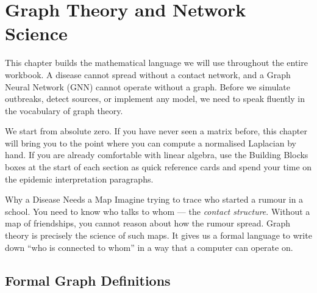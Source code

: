 \chapter{Graph Theory and Network Science}

This chapter builds the mathematical language we will use throughout the entire workbook. A disease cannot spread without a contact network, and a Graph Neural Network (GNN) cannot operate without a graph. Before we simulate outbreaks, detect sources, or implement any model, we need to speak fluently in the vocabulary of graph theory.

We start from absolute zero. If you have never seen a matrix before, this chapter will bring you to the point where you can compute a normalised Laplacian by hand. If you are already comfortable with linear algebra, use the Building Blocks boxes at the start of each section as quick reference cards and spend your time on the epidemic interpretation paragraphs.

\begin{analogybox}{Why a Disease Needs a Map}
Imagine trying to trace who started a rumour in a school. You need to know who talks to whom --- the \emph{contact structure}. Without a map of friendships, you cannot reason about how the rumour spread. Graph theory is precisely the science of such maps. It gives us a formal language to write down ``who is connected to whom'' in a way that a computer can operate on.
\end{analogybox}

\section{Formal Graph Definitions}
\label{sec:graph_definitions}

